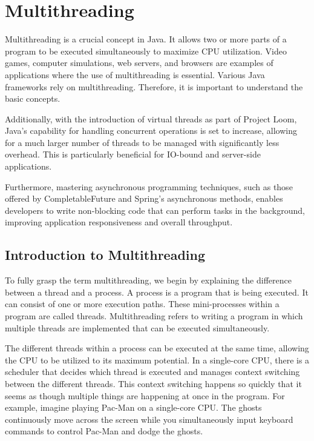 \chapter{Multithreading}

\begin{summary}
Multithreading is a crucial concept in Java. It allows two or more parts of a program to be executed simultaneously to maximize CPU utilization. Video games, computer simulations, web servers, and browsers are examples of applications where the use of multithreading is essential. Various Java frameworks rely on multithreading. Therefore, it is important to understand the basic concepts.

Additionally, with the introduction of virtual threads as part of Project Loom, Java’s capability for handling concurrent operations is set to increase, allowing for a much larger number of threads to be managed with significantly less overhead. This is particularly beneficial for IO-bound and server-side applications.

Furthermore, mastering asynchronous programming techniques, such as those offered by CompletableFuture and Spring's asynchronous methods, enables developers to write non-blocking code that can perform tasks in the background, improving application responsiveness and overall throughput.
\end{summary}

\section{Introduction to Multithreading}

To fully grasp the term multithreading, we begin by explaining the difference between a thread and a process. A process is a program that is being executed. It can consist of one or more execution paths. These mini-processes within a program are called threads. Multithreading refers to writing a program in which multiple threads are implemented that can be executed simultaneously.

The different threads within a process can be executed at the same time, allowing the CPU to be utilized to its maximum potential. In a single-core CPU, there is a scheduler that decides which thread is executed and manages context switching between the different threads. This context switching happens so quickly that it seems as though multiple things are happening at once in the program. For example, imagine playing Pac-Man on a single-core CPU. The ghosts continuously move across the screen while you simultaneously input keyboard commands to control Pac-Man and dodge the ghosts.

